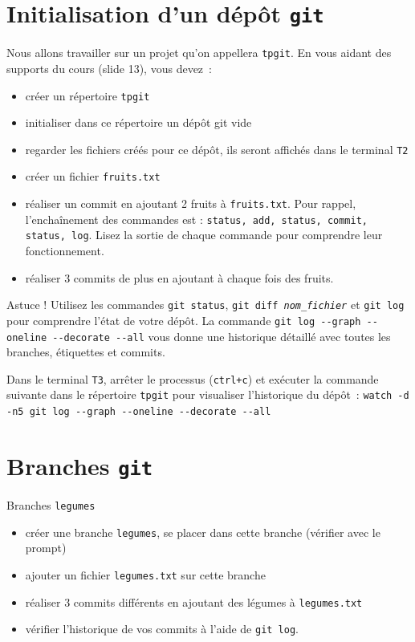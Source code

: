 \documentclass[final, a4paper, openbib, ]{article}
\begin{document}
\section{Initialisation d'un dépôt \texttt{git}}

Nous allons travailler sur un projet qu'on appellera \texttt{tpgit}.
En vous aidant des supports du cours (slide 13), vous devez~:
\begin{itemize}
\item créer un répertoire \texttt{tpgit}
\item initialiser dans ce répertoire un dépôt git vide
\item regarder les fichiers créés pour ce dépôt, ils seront affichés dans le terminal \texttt{T2}
\item créer un fichier \texttt{fruits.txt}
\item réaliser un commit en ajoutant 2 fruits à \texttt{fruits.txt}.
Pour rappel, l'enchaînement des commandes est : \texttt{status, add, status, commit, status, log}.
Lisez la sortie de chaque commande pour comprendre leur fonctionnement.
\item réaliser 3 commits de plus en ajoutant à chaque fois des fruits.
\end{itemize}

\begin{alertinfo3}{Astuce !}
Utilisez les commandes \texttt{git status}, \texttt{git diff \textit{nom\_fichier}} et \texttt{git log} pour comprendre l'état de votre dépôt. La commande \texttt{git log -}\texttt{-graph -}\texttt{-oneline -}\texttt{-decorate -}\texttt{-all} vous donne une historique détaillé avec toutes les branches, étiquettes et commits.

\end{alertinfo3}

Dans le terminal \texttt{T3}, arrêter le processus (\texttt{ctrl+c}) et exécuter la commande suivante dans le répertoire \texttt{tpgit} pour visualiser l'historique du dépôt~: \verb+watch -d -n5 git log --graph --oneline --decorate --all+ 
\section{Branches \texttt{git}}

Branches \texttt{legumes}
\begin{itemize}
\item créer une branche \texttt{legumes}, se placer dans cette branche (vérifier avec le prompt)
\item ajouter un fichier \texttt{legumes.txt} sur cette branche
\item réaliser 3 commits différents en ajoutant des légumes à \texttt{legumes.txt}
\item vérifier l'historique de vos commits à l'aide de \texttt{git log}.
\end{itemize}
\end{document}
